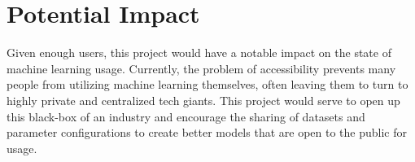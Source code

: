 \documentclass{article}
\begin{document}
    \section{Potential Impact}

    Given enough users, this project would have a notable impact on the state of machine learning usage.  Currently,
    the problem of accessibility prevents many people from utilizing machine learning themselves, often leaving them to
    turn to highly private and centralized tech giants.  This project would serve to open up this black-box of
    an industry and encourage the sharing of datasets and parameter configurations to create better models that are open
    to the public for usage.
\end{document}
